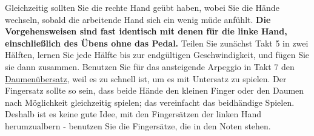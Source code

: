 Gleichzeitig sollten Sie die rechte Hand geübt haben, wobei Sie die Hände wechseln, sobald die arbeitende Hand sich ein wenig müde anfühlt.
\textbf{Die Vorgehensweisen sind fast identisch mit denen für die linke Hand, einschließlich des Übens ohne das Pedal.}
Teilen Sie zunächst Takt 5 in zwei Hälften, lernen Sie jede Hälfte bis zur endgültigen Geschwindigkeit, und fügen Sie sie dann zusammen.
Benutzen Sie für das ansteigende Arpeggio in Takt 7 den \hyperref[c1iii5a]{Daumenübersatz}, weil es zu schnell ist, um es mit Untersatz zu spielen.
Der Fingersatz sollte so sein, dass beide Hände den kleinen Finger oder den Daumen nach Möglichkeit gleichzeitig spielen; das vereinfacht das beidhändige Spielen.
Deshalb ist es keine gute Idee, mit den Fingersätzen der linken Hand herumzualbern - benutzen Sie die Fingersätze, die in den Noten stehen.

